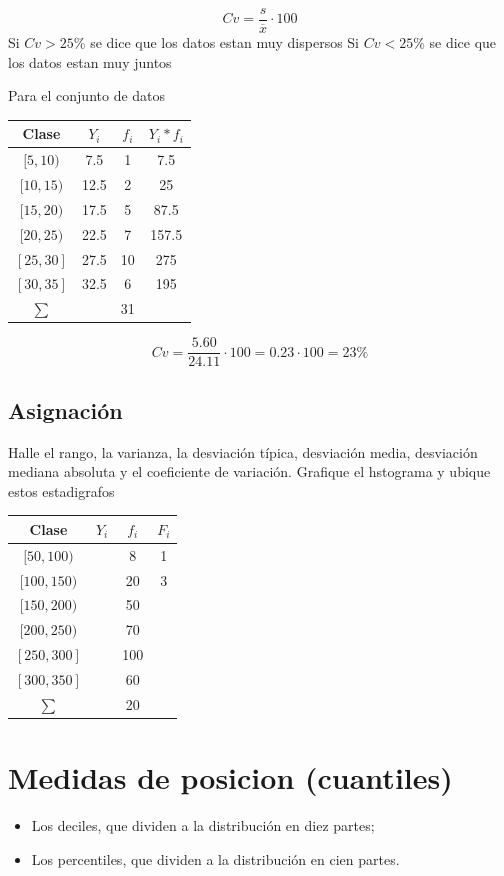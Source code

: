 \documentclass[10pt,]{krantz}
\providecommand{\tightlist}{%
  \setlength{\itemsep}{0pt}\setlength{\parskip}{0pt}}
\theoremstyle{definition}
\theoremstyle{definition}
\theoremstyle{definition}
\theoremstyle{definition}
\theoremstyle{remark}
\begin{document}
\[Cv=\frac{s}{\overline{x}}\cdot 100\]
Si \(Cv>25\%\) se dice que los datos estan muy dispersos
Si \(Cv<25\%\) se dice que los datos estan muy juntos

Para el conjunto de datos

\begin{longtable}[]{@{}cccc@{}}
\toprule
Clase & \(Y_i\) & \(f_i\) & \(Y_i*f_i\)\tabularnewline
\midrule
\endhead
\([5,10)\) & 7.5 & 1 & 7.5\tabularnewline
\([10,15)\) & 12.5 & 2 & 25\tabularnewline
\([15,20)\) & 17.5 & 5 & 87.5\tabularnewline
\([20,25)\) & 22.5 & 7 & 157.5\tabularnewline
\([25,30]\) & 27.5 & 10 & 275\tabularnewline
\([30,35]\) & 32.5 & 6 & 195\tabularnewline
\(\sum\) & & 31 &\tabularnewline
\bottomrule
\end{longtable}

\[Cv=\frac{5.60}{24.11}\cdot 100=0.23\cdot 100=23\%\]

\hypertarget{asignaciuxf3n-2}{%
\section{Asignación}\label{asignaciuxf3n-2}}

Halle el rango, la varianza, la desviación típica, desviación media, desviación mediana absoluta y el coeficiente de variación. Grafique el hstograma y ubique estos estadigrafos

\begin{longtable}[]{@{}cccc@{}}
\toprule
Clase & \(Y_i\) & \(f_i\) & \(F_i\)\tabularnewline
\midrule
\endhead
\([50,100)\) & & 8 & 1\tabularnewline
\([100,150)\) & & 20 & 3\tabularnewline
\([150,200)\) & & 50 &\tabularnewline
\([200,250)\) & & 70 &\tabularnewline
\([250,300]\) & & 100 &\tabularnewline
\([300,350]\) & & 60 &\tabularnewline
\(\sum\) & & 20 &\tabularnewline
\bottomrule
\end{longtable}

\hypertarget{medidas-de-posicion-cuantiles}{%
\chapter{Medidas de posicion (cuantiles)}\label{medidas-de-posicion-cuantiles}}

\begin{itemize}
\tightlist
\item
  Los deciles, que dividen a la distribución en diez partes;
\item
  Los percentiles, que dividen a la distribución en cien partes.
\end{itemize}
\end{document}
